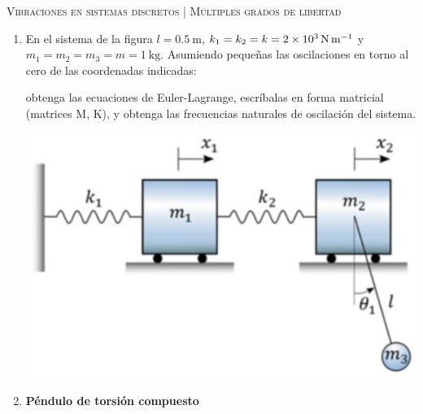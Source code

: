 \documentclass[11pt, spanish, a4paper, twopage]{article}
\begin{document}
\begin{center}
	\textsc{\large Vibraciones en sistemas discretos | Múltiples grados de libertad}
\end{center}


\begin{enumerate}

				
\item 
\begin{minipage}[t][4cm]{0.65\textwidth}
En el sistema de la figura \(l = \SI{0.5}{\metre}\), \(k_1 = k_2 = k = \SI{2E3}{\newton\per\metre}\) y \(m_1 = m_2 = m_3 = m = \SI{1}{\kilo\gram}\).
Asumiendo pequeñas las oscilaciones en torno al cero de las coordenadas indicadas:
\begin{tasks}
	\task obtenga las ecuaciones de Euler-Lagrange,
	\task escríbalas en forma matricial (matrices M, K), y
	\task obtenga las frecuencias naturales de oscilación del sistema.
\end{tasks}
\end{minipage}
\begin{minipage}[c][0cm][t]{0.3\textwidth}
	\includegraphics[width=\textwidth]{figures/shabana_fig_P3_6.png}
\end{minipage}



\item 
\begin{minipage}[t][2.5cm]{0.65\textwidth}
\textbf{Péndulo de torsión compuesto}


\end{minipage}
\end{enumerate}
\end{document}
